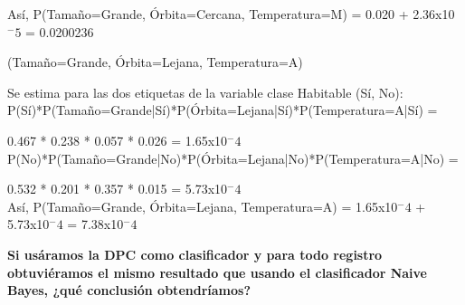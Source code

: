 \documentclass[11pt]{exam}
\begin{document}
\begin{questions}
{\begin{enumerate}
	Así, P(Tamaño=Grande, Órbita=Cercana, Temperatura=M) = 0.020 + 2.36x10$^-5$ = 0.0200236
	
	{\bf \item (Tamaño=Grande, Órbita=Lejana, Temperatura=A)}
	
	Se estima para las dos etiquetas de la variable clase Habitable (Sí, No): \\
	
	P(Sí)*P(Tamaño=Grande|Sí)*P(Órbita=Lejana|Sí)*P(Temperatura=A|Sí) = 
	
	0.467 * 0.238 * 0.057 * 0.026 = 1.65x10$^-4$ \\
	
	P(No)*P(Tamaño=Grande|No)*P(Órbita=Lejana|No)*P(Temperatura=A|No) =
	
	0.532 * 0.201 * 0.357 * 0.015 = 5.73x10$^-4$ \\
	
	Así, P(Tamaño=Grande, Órbita=Lejana, Temperatura=A) = 1.65x10$^-4$ + 5.73x10$^-4$ = 7.38x10$^-4$
	
\end{enumerate}
}

{\bf \question Si usáramos la DPC como clasificador y para todo registro obtuviéramos el mismo resultado que usando el clasificador Naive Bayes, ¿qué conclusión obtendríamos?}

\end{questions}
\end{document}

